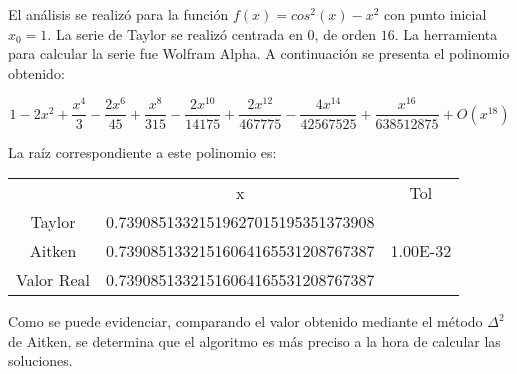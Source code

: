 \documentclass[a4paper,12pt]{article}
\begin{document}
El análisis se realizó para la función $f(x)=cos^2(x)-x^2$ con punto inicial $x_0 = 1$. La serie de Taylor se realizó centrada en $0$, de orden $16$. La herramienta para calcular la serie fue Wolfram Alpha. A continuación se presenta el polinomio obtenido: \par

\[ 1 - 2 x^2 + \frac{x^4}{3} - \frac{2x^6}{45} + \frac{x^8}{315} - \frac{2 x^{10}}{14175} + \frac{2 x^{12}}{467775} - \frac{4x^{14}}{42567525} + \frac{x^{16}}{638512875} + O(x^{18}) \]

La raíz correspondiente a este polinomio es: \par

\begin{table}[ht!]
\begin{tabular}{clc}
\multicolumn{1}{l}{} & \multicolumn{1}{c}{x}              & Tol                  \\
Taylor               & 0.73908513321519627015195351373908 &                      \\
Aitken               & 0.73908513321516064165531208767387 & 1.00E-32             \\
Valor Real           & 0.73908513321516064165531208767387 & \multicolumn{1}{l}{}
\end{tabular}
\end{table}

Como se puede evidenciar, comparando el valor obtenido mediante el método $\Delta^2$ de Aitken, se determina que el algoritmo es más preciso a la hora de calcular las soluciones.

\newpage
\end{document}

